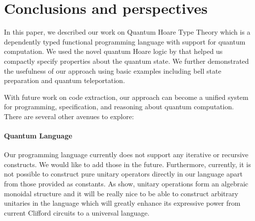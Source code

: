 \documentclass[adraft,creativecommons]{eptcs}
\theoremstyle{definition}
\theoremstyle{remark}
\begin{document}








\section{Conclusions and perspectives}
\label{sec:conclusion}
In this paper, we described our work on Quantum Hoare Type Theory which is a dependently typed functional programming language with support for quantum computation. We used the novel quantum Hoare logic by \textcite{unruh2019} that helped us compactly specify properties about the quantum state. We further demonstrated the usefulness of our approach using basic examples including bell state preparation and quantum teleportation.

With future work on code extraction, our approach can become a unified system for programming, specification, and reasoning about quantum computation. There are several other avenues to explore:

\paragraph{Quantum Language} Our programming language currently does not support any iterative or recursive constructs. We would like to add those in the future. Furthermore, currently, it is not possible to construct pure unitary operators directly in our language apart from those provided as constants. As \textcite{qio} show, unitary operations form an algebraic monoidal structure and it will be really nice to be able to construct arbitrary unitaries in the language which will greatly enhance its expressive power from current Clifford circuits to a universal language.
\end{document}
